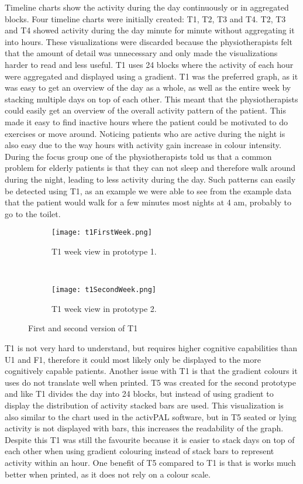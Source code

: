 Timeline charts show the activity during the day continuously or in aggregated blocks. Four timeline charts were initially created: T1, T2, T3 and T4. T2, T3 and T4 showed activity during the day minute for minute without aggregating it into hours. These visualizations were discarded because the physiotherapists felt that the amount of detail was unnecessary and only made the visualizations harder to read and less useful. T1 uses 24 blocks where the activity of each hour were aggregated and displayed using a gradient. T1 was the preferred graph, as it was easy to get an overview of the day as a whole, as well as the entire week by stacking multiple days on top of each other. This meant that the physiotherapists could easily get an overview of the overall activity pattern of the patient. This made it easy to find inactive hours where the patient could be motivated to do exercises or move around. Noticing patients who are active during the night is also easy due to the way hours with activity gain increase in colour intensity. During the focus group one of the physiotherapists told us that a common problem for elderly patients is that they can not sleep and therefore walk around during the night, leading to less activity during the day. Such patterns can easily be detected using T1, as an example we were able to see from the example data that the patient would walk for a few minutes most nights at 4 am, probably to go to the toilet.

\begin{figure}[h!]
  \centering
  \begin{subfigure}[b]{1\textwidth}
    \centering
    \texttt{[image: t1FirstWeek.png]}
    \caption{T1 week view in prototype 1.}
  \end{subfigure}
  \\
  \begin{subfigure}[b]{0.6\textwidth}
    \centering
    \texttt{[image: t1SecondWeek.png]}
    \caption{T1 week view in prototype 2.}
  \end{subfigure} 
  \caption{First and second version of T1}
  \label{fig:tComparison}
\end{figure} 

T1 is not very hard to understand, but requires higher cognitive capabilities than U1 and F1, therefore it could most likely only be displayed to the more cognitively capable patients. Another issue with T1 is that the gradient colours it uses do not translate well when printed. T5 was created for the second prototype and like T1 divides the day into 24 blocks, but instead of using gradient to display the distribution of activity stacked bars are used. This visualization is also similar to the chart used in the activPAL software, but in T5 seated or lying activity is not displayed with bars, this increases the readability of the graph. Despite this T1 was still the favourite because it is easier to stack days on top of each other when using gradient colouring instead of stack bars to represent activity within an hour. One benefit of T5 compared to T1 is that is works much better when printed, as it does not rely on a colour scale.

